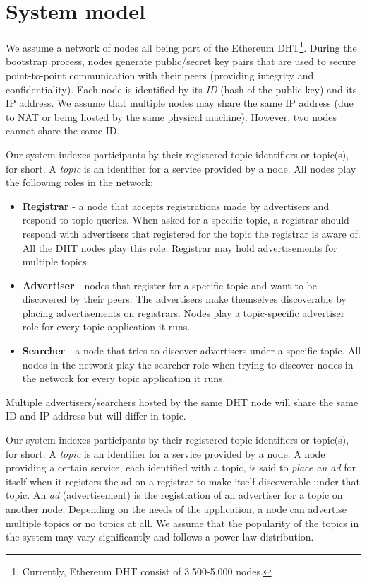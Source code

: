 
\section{System model}
We assume a network of nodes all being part of the Ethereum DHT\footnote{Currently, Ethereum DHT consist of 3,500-5,000 nodes.}. During the bootstrap process, nodes generate public/secret key pairs that are used to secure point-to-point communication with their peers (providing integrity and confidentiality). Each node is identified by its \emph{ID} (hash of the public key) and its IP address. We assume that multiple nodes may share the same IP address (due to NAT or being hosted by the same physical machine). However,  two nodes cannot share the same ID.  

Our system indexes participants by their registered topic identifiers or topic(s), for short. 
A \emph{topic} is an identifier for a service provided by a node. 
All nodes play the following roles in the network:

\begin{itemize}
    \item \textbf{Registrar} - a node that accepts registrations made by advertisers and respond to topic queries. When asked for a specific topic, a registrar should respond with advertisers that registered for the topic the registrar is aware of. 
All the DHT nodes play this role. 
Registrar may hold advertisements for multiple topics. 
    \item \textbf{Advertiser} - nodes that register for a specific topic and want to be discovered by their peers. The advertisers make themselves discoverable by placing advertisements on registrars. Nodes play a topic-specific advertiser role for every topic application it runs.
    \item \textbf{Searcher} - a node that tries to discover advertisers under a specific topic. 
All nodes in the network play the searcher role when trying to discover nodes in the network for every topic application it runs.
\end{itemize}

Multiple advertisers/searchers hosted by the same DHT node will share the same ID and IP address but will differ in topic. 


Our system indexes participants by their registered topic identifiers or topic(s), for short. A \emph{topic} is an identifier for a service provided by a node. A node providing a certain service, each identified with a topic, is said to \emph{place an ad} for itself when it registers the ad on a registrar to make itself discoverable under that topic. An \emph{ad} (\ie advertisement) is the registration of an advertiser for a topic on another node. Depending on the needs of the application, a node can advertise multiple topics or no topics at all. We assume that the popularity of the topics in the system may vary significantly and follows a power law distribution. 

